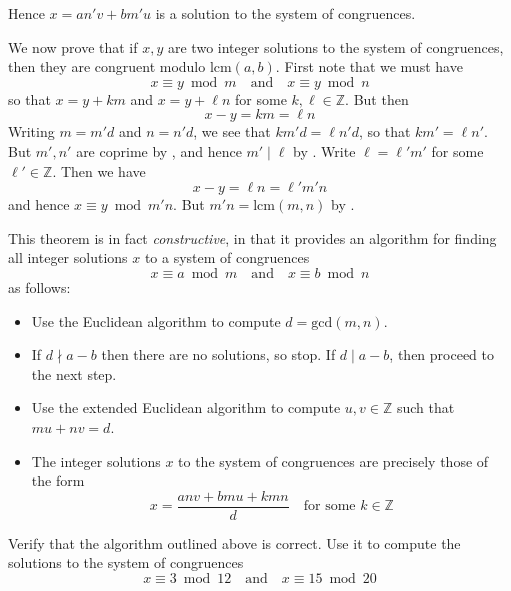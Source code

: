 \begin{cproof}
\begin{itemize}
Hence $x = an'v+bm'u$ is a solution to the system of congruences.
\end{itemize}

We now prove that if $x,y$ are two integer solutions to the system of congruences, then they are congruent modulo $\mathrm{lcm}(a,b)$. First note that we must have
\[ x \equiv y \bmod m \quad \text{and} \quad x \equiv y \bmod n \]
so that $x=y+km$ and $x=y+\ell n$ for some $k,\ell \in \mathbb{Z}$. But then
\[ x-y=km=\ell n \]
Writing $m=m'd$ and $n=n'd$, we see that $km'd = \ell n'd$, so that $km' = \ell n'$. But $m',n'$ are coprime by , and hence $m' \mid \ell$ by . Write $\ell = \ell'm'$ for some $\ell' \in \mathbb{Z}$. Then we have
\[ x-y = \ell n = \ell' m' n \]
and hence $x \equiv y \bmod m'n$. But $m'n = \mathrm{lcm}(m,n)$ by .
\end{cproof}

This theorem is in fact \textit{constructive}, in that it provides an algorithm for finding all integer solutions $x$ to a system of congruences
\[ x \equiv a \bmod m \quad \text{and} \quad x \equiv b \bmod n \]
as follows:
\begin{itemize}
\item Use the Euclidean algorithm to compute $d=\mathrm{gcd}(m,n)$.
\item If $d \nmid a-b$ then there are no solutions, so stop. If $d \mid a-b$, then proceed to the next step.
\item Use the extended Euclidean algorithm to compute $u,v \in \mathbb{Z}$ such that $mu+nv=d$.
\item The integer solutions $x$ to the system of congruences are precisely those of the form
\[ x = \frac{anv + bmu + kmn}{d} \quad \text{for some } k \in \mathbb{Z} \]
\end{itemize}

\begin{exercise}
\label{exCRTAlgorithm}
Verify that the algorithm outlined above is correct. Use it to compute the solutions to the system of congruences
\[ x \equiv 3 \bmod{12} \quad \text{and} \quad x \equiv 15 \bmod{20} \]
\end{exercise}

